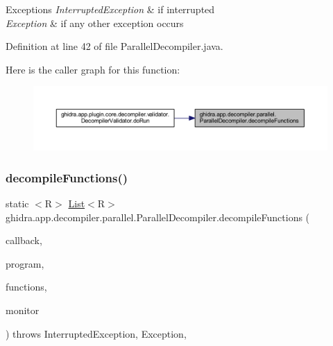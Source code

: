\begin{DoxyExceptions}{Exceptions}
{\em Interrupted\+Exception} & if interrupted \\
\hline
{\em Exception} & if any other exception occurs \\
\hline
\end{DoxyExceptions}


Definition at line 42 of file Parallel\+Decompiler.\+java.

Here is the caller graph for this function\+:
\nopagebreak
\begin{figure}[H]
\begin{center}
\leavevmode
\includegraphics[width=350pt]{classghidra_1_1app_1_1decompiler_1_1parallel_1_1_parallel_decompiler_a7b17ca6d07341440ab1fca5e5c4d437d_icgraph}
\end{center}
\end{figure}
\mbox{\label{classghidra_1_1app_1_1decompiler_1_1parallel_1_1_parallel_decompiler_ac860fec7f7fa5092f9e0851aef5f10dd}} 
\subsubsection{\texorpdfstring{decompileFunctions()}{decompileFunctions()}\hspace{0.1cm}{\footnotesize\ttfamily [2/2]}}
{\footnotesize\ttfamily static $<$R$>$ \mbox{\hyperlink{xml_8hh_ab5ab62f46b3735557c125f91b40ac155}{List}}$<$R$>$ ghidra.\+app.\+decompiler.\+parallel.\+Parallel\+Decompiler.\+decompile\+Functions (\begin{DoxyParamCaption}\item[{Q\+Callback$<$ Function, R $>$}]{callback,  }\item[{Program}]{program,  }\item[{Collection$<$ Function $>$}]{functions,  }\item[{Task\+Monitor}]{monitor }\end{DoxyParamCaption}) throws Interrupted\+Exception, Exception\hspace{0.3cm}{\ttfamily [inline]}, {\ttfamily [static]}}

